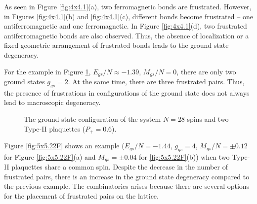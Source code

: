 \documentclass[preprint,12pt]{elsarticle}
\begin{document}
\begin{figure}[H]
	\end{figure}
	
	As seen in Figure \ref{fig:4x4.1}(a), two ferromagnetic bonds are frustrated. However, in Figures \ref{fig:4x4.1}(b) and \ref{fig:4x4.1}(c), different bonds become frustrated -- one antiferromagnetic and one ferromagnetic. In Figure \ref{fig:4x4.1}(d), two frustrated antiferromagnetic bonds are also observed. Thus, the absence of localization or a fixed geometric arrangement of frustrated bonds leads to the ground state degeneracy.
	
	For the example in Figure \ref{fig:4x7}, $E_{gs}/N \approx -1.39$, $M_{gs}/N=0$, there are only two ground states $g_{gs}=2$. At the same time, there are three frustrated pairs. Thus, the presence of frustrations in configurations of the ground state does not always lead to macroscopic degeneracy. 
	
	\begin{figure}[H]
		\centering
		\caption{The ground state configuration of the system $N=28$ spins and two Type-II plaquettes ($P_+=0.6$).}
		\label{fig:4x7}
	\end{figure}
	
	Figure \ref{fig:5x5.22F} shows an example ($E_{gs}/N=-1.44$, $g_{gs}=4$, $M_{gs}/N=\pm 0.12$ for Figure \ref{fig:5x5.22F}(a) and $M_{gs}=\pm 0.04$ for \ref{fig:5x5.22F}(b)) when two Type-II plaquettes share a common spin. Despite the decrease in the number of frustrated pairs, there is an increase in the ground state degeneracy compared to the previous example. The combinatorics arises because there are several options for the placement of frustrated pairs on the lattice.
	
\end{document}
